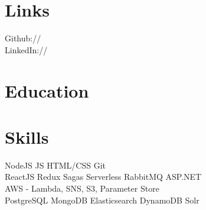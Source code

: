 \documentclass[]{deedy-resume-openfont}
\begin{document}
\begin{minipage}[t]{0.33\textwidth}

%
%


\section{Links}
Github:// \href{https://github.com/ColCross}{} \\
LinkedIn://  \href{https://www.linkedin.com/in/coltencross}{}
\sectionsep


\section{Education} 
\sectionsep

%
%

\end{minipage} 
\hfill
\begin{minipage}[t]{0.66\textwidth} 


\section{Skills}
NodeJS \textbullet{} JS \textbullet{} HTML/CSS \textbullet{} Git \\
ReactJS \textbullet{} Redux \textbullet{} Sagas \textbullet{} Serverless \textbullet{} RabbitMQ \textbullet{} ASP.NET\\
AWS - Lambda, SNS, S3, Parameter Store\\
PostgreSQL \textbullet{} MongoDB \textbullet{} Elasticsearch \textbullet{} DynamoDB \textbullet{} Solr\\
\sectionsep

\end{minipage}
\sectionsep
\end{document}
